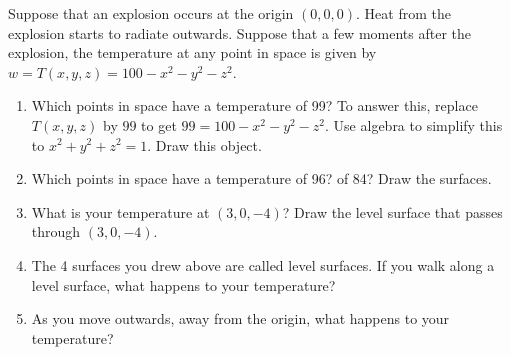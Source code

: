 \begin{problem}%
%
%
 Suppose that an explosion occurs at the origin $(0,0,0)$. Heat from the explosion starts to radiate outwards.  Suppose that a few moments after the explosion, the temperature at any point in space is given by $w=T(x,y,z)=100-x^2-y^2-z^2.$ 
\begin{enumerate}
 \item Which points in space have a temperature of 99?  To answer this, replace $T(x,y,z)$ by $99$ to get $99=100-x^2-y^2-z^2$. Use algebra to simplify this to $x^2+y^2+z^2=1$.  Draw this object.
 \item Which points in space have a temperature of 96? of 84? Draw the surfaces. 
 \item What is your temperature at $(3,0,-4)$? Draw the level surface that passes through $(3,0,-4)$.
\item The 4 surfaces you drew above are called level surfaces. If you walk along a level surface, what happens to your temperature?
 \item As you move outwards, away from the origin, what happens to your temperature?
\end{enumerate}
\end{problem}


